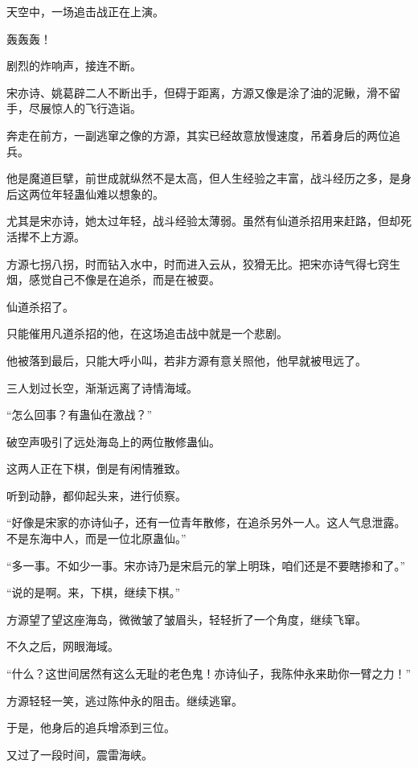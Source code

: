 
\begin{this_body}

天空中，一场追击战正在上演。

轰轰轰！

剧烈的炸响声，接连不断。

宋亦诗、姚葛辟二人不断出手，但碍于距离，方源又像是涂了油的泥鳅，滑不留手，尽展惊人的飞行造诣。

奔走在前方，一副逃窜之像的方源，其实已经故意放慢速度，吊着身后的两位追兵。

他是魔道巨擘，前世成就纵然不是太高，但人生经验之丰富，战斗经历之多，是身后这两位年轻蛊仙难以想象的。

尤其是宋亦诗，她太过年轻，战斗经验太薄弱。虽然有仙道杀招用来赶路，但却死活撵不上方源。

方源七拐八拐，时而钻入水中，时而进入云从，狡猾无比。把宋亦诗气得七窍生烟，感觉自己不像是在追杀，而是在被耍。

仙道杀招了。

只能催用凡道杀招的他，在这场追击战中就是一个悲剧。

他被落到最后，只能大呼小叫，若非方源有意关照他，他早就被甩远了。

三人划过长空，渐渐远离了诗情海域。

“怎么回事？有蛊仙在激战？”

破空声吸引了远处海岛上的两位散修蛊仙。

这两人正在下棋，倒是有闲情雅致。

听到动静，都仰起头来，进行侦察。

“好像是宋家的亦诗仙子，还有一位青年散修，在追杀另外一人。这人气息泄露。不是东海中人，而是一位北原蛊仙。”

“多一事。不如少一事。宋亦诗乃是宋启元的掌上明珠，咱们还是不要瞎掺和了。”

“说的是啊。来，下棋，继续下棋。”

方源望了望这座海岛，微微皱了皱眉头，轻轻折了一个角度，继续飞窜。

不久之后，网眼海域。

“什么？这世间居然有这么无耻的老色鬼！亦诗仙子，我陈仲永来助你一臂之力！”

方源轻轻一笑，逃过陈仲永的阻击。继续逃窜。

于是，他身后的追兵增添到三位。

又过了一段时间，震雷海峡。


\end{this_body}

